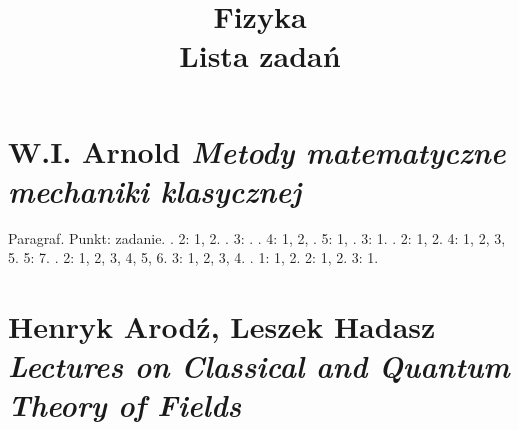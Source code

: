 \documentclass[a4paper,11pt]{article}
\title{Fizyka \\
  {\Large Lista zadań}}
\numberwithin{equation}{section}
\begin{document}





\maketitle





\section{W.I. Arnold \textit{Metody matematyczne mechaniki
    klasycznej}}

\label{sec:Oznaczenia-i-konwencje}


\noindent
Paragraf. Punkt: zadanie. . 2: 1, 2. . 3: .
. 4: 1, 2, . 5: 1, . 3: 1.
. 2: 1, 2. 4: 1, 2, 3, 5. 5: 7. . 2: 1, 2, 3,
4, 5, 6. 3: 1, 2, 3, 4. . 1: 1, 2. 2: 1, 2. 3: 1.










\section{Henryk Arodź, Leszek Hadasz \textit{Lectures on
    Classical and Quantum Theory of Fields}}

\label{sec:Oznaczenia-i-konwencje}
\end{document}
